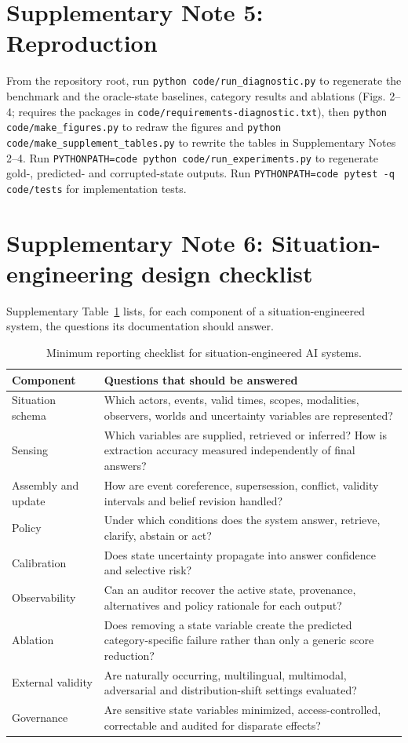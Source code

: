 \documentclass[Numbered]{sn-jnl}
\begin{document}
\section*{Supplementary Note 5: Reproduction}
From the repository root, run \texttt{python code/run\_diagnostic.py} to
regenerate the benchmark and the oracle-state baselines, category results and
ablations (Figs. 2--4; requires the packages in
\texttt{code/requirements-diagnostic.txt}), then
\texttt{python code/make\_figures.py} to redraw the figures and \texttt{python code/make\_supplement\_tables.py}
to rewrite the tables in Supplementary Notes 2--4. Run
\texttt{PYTHONPATH=code python code/run\_experiments.py} to regenerate
gold-, predicted- and corrupted-state outputs. Run
\texttt{PYTHONPATH=code pytest -q code/tests} for implementation tests.

\section*{Supplementary Note 6: Situation-engineering design checklist}
Supplementary Table~\ref{stab:checklist} lists, for each component of a
situation-engineered system, the questions its documentation should answer.

\begin{table}[!ht]
\centering
\caption{Minimum reporting checklist for situation-engineered AI systems.}
\label{stab:checklist}
\begin{tabularx}{\linewidth}{p{3.2cm}X}
\toprule
Component & Questions that should be answered \\
\midrule
Situation schema & Which actors, events, valid times, scopes, modalities, observers, worlds and uncertainty variables are represented? \\
Sensing & Which variables are supplied, retrieved or inferred? How is extraction accuracy measured independently of final answers? \\
Assembly and update & How are event coreference, supersession, conflict, validity intervals and belief revision handled? \\
Policy & Under which conditions does the system answer, retrieve, clarify, abstain or act? \\
Calibration & Does state uncertainty propagate into answer confidence and selective risk? \\
Observability & Can an auditor recover the active state, provenance, alternatives and policy rationale for each output? \\
Ablation & Does removing a state variable create the predicted category-specific failure rather than only a generic score reduction? \\
External validity & Are naturally occurring, multilingual, multimodal, adversarial and distribution-shift settings evaluated? \\
Governance & Are sensitive state variables minimized, access-controlled, correctable and audited for disparate effects? \\
\bottomrule
\end{tabularx}
\end{table}
\end{document}
